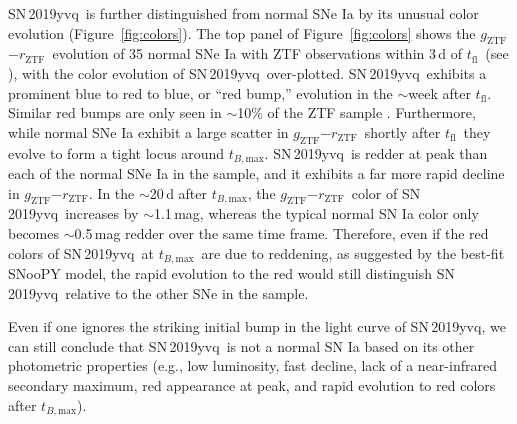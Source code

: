 \documentclass[twocolumn]{aastex63}
\newcommand{\rztf}{$r_\mathrm{ZTF}$}
\newcommand{\gztf}{$g_\mathrm{ZTF}$}
\newcommand{\tfl}{$t_\mathrm{fl}$}
\newcommand{\tbmax}{$t_{B,\mathrm{max}}$}
\newcommand{\sn}{SN\,2019yvq}
\begin{document}
\sn\ is further distinguished from normal SNe Ia by its unusual color
evolution (Figure~\ref{fig:colors}). The top panel of Figure~\ref{fig:colors}
shows the \gztf$ - $\rztf\ evolution of 35 normal SNe Ia with ZTF
observations within 3\,d of \tfl\ (see \citealt{Bulla20}), with the color
evolution of \sn\ over-plotted. \sn\ exhibits a prominent blue to red to
blue, or ``red bump,'' evolution in the $\sim$week after \tfl. Similar red
bumps are only seen in $\sim$10\% of the ZTF sample \citep{Bulla20}.
Furthermore, while normal SNe Ia exhibit a large scatter in \gztf$ - $\rztf\
shortly after \tfl\ they evolve to form a tight locus around \tbmax. \sn\ is
redder at peak than each of the normal SNe Ia in the \citet{Bulla20} sample,
and it exhibits a far more rapid decline in \gztf$ - $\rztf. In the
$\sim$20\,d after \tbmax, the \gztf$ - $\rztf\ color of \sn\ increases by
$\sim$1.1\,mag, whereas the typical normal SN Ia color only becomes
$\sim$0.5\,mag redder over the same time frame. Therefore, even if the red
colors of \sn\ at \tbmax\ are due to reddening, as suggested by the best-fit
SNooPY model, the rapid evolution to the red would still distinguish \sn\
relative to the other SNe in the sample.

Even if one ignores the striking initial bump in the light curve of \sn, we
can still conclude that \sn\ is not a normal SN Ia based on its other
photometric properties (e.g., low luminosity, fast decline, lack of a
near-infrared secondary maximum, red appearance at peak, and rapid evolution
to red colors after \tbmax).
\end{document}
